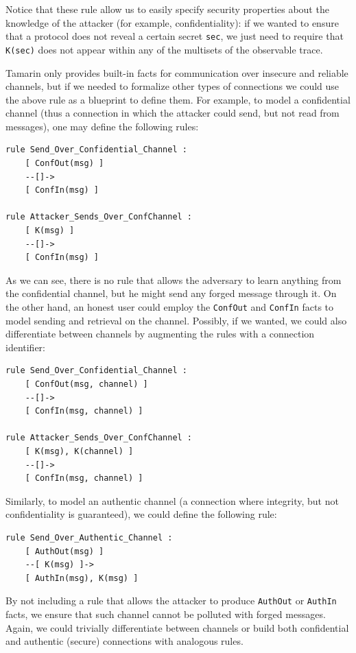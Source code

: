 \documentclass[fleqn,10pt]{SelfArx} %
\begin{document}
Notice that these rule allow us to easily specify security properties about the knowledge of the attacker (for example, confidentiality): if we wanted to ensure that a protocol does not reveal a certain secret \lstinline|sec|, we just need to require that \lstinline|K(sec)| does not appear within any of the multisets of the observable trace.

Tamarin only provides built-in facts for communication over insecure and reliable channels, but if we needed to formalize other types of connections we could use the above rule as a blueprint to define them. For example, to model a confidential channel (thus a connection in which the attacker could send, but not read from messages), one may define the following rules:

\begin{lstlisting}[language=Tamarin]
rule Send_Over_Confidential_Channel :
    [ ConfOut(msg) ]
    --[]->
    [ ConfIn(msg) ]

rule Attacker_Sends_Over_ConfChannel :
    [ K(msg) ]
    --[]->
    [ ConfIn(msg) ]
\end{lstlisting}

As we can see, there is no rule that allows the adversary to learn anything from the confidential channel, but he might send any forged message through it. On the other hand, an honest user could employ the \lstinline|ConfOut| and \lstinline|ConfIn| facts to model sending and retrieval on the channel. Possibly, if we wanted, we could also differentiate between channels by augmenting the rules with a connection identifier:

\begin{lstlisting}[language=Tamarin]
rule Send_Over_Confidential_Channel :
    [ ConfOut(msg, channel) ]
    --[]->
    [ ConfIn(msg, channel) ]

rule Attacker_Sends_Over_ConfChannel :
    [ K(msg), K(channel) ]
    --[]->
    [ ConfIn(msg, channel) ]
\end{lstlisting}

Similarly, to model an authentic channel (a connection where integrity, but not confidentiality is guaranteed), we could define the following rule:

\begin{lstlisting}[language=Tamarin]
rule Send_Over_Authentic_Channel :
    [ AuthOut(msg) ]
    --[ K(msg) ]->
    [ AuthIn(msg), K(msg) ]
\end{lstlisting}

By not including a rule that allows the attacker to produce \lstinline|AuthOut| or \lstinline|AuthIn| facts, we ensure that such channel cannot be polluted with forged messages. Again, we could trivially differentiate between channels or build both confidential and authentic (secure) connections with analogous rules.
\end{document}
